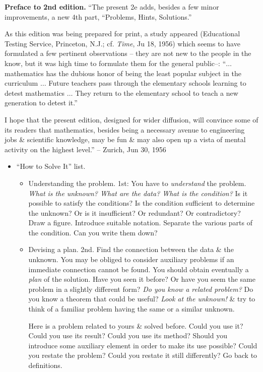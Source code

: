 \documentclass{article}
\begin{document}
\begin{enumerate}
	{\bf Preface to 2nd edition.} ``The present 2e adds, besides a few minor improvements, a new 4th part, ``Problems, Hints, Solutions.''

	As this edition was being prepared for print, a study appeared (Educational Testing Service, Princeton, N.J.; cf. {\it Time}, Ju 18, 1956) which seems to have formulated a few pertinent observations -- they are not new to the people in the know, but it was high time to formulate them for the general public--: ``$\ldots$ mathematics has the dubious honor of being the least popular subject in the curriculum $\ldots$ Future teachers pass through the elementary schools learning to detest mathematics $\ldots$ They return to the elementary school to teach a new generation to detest it.''

	I hope that the present edition, designed for wider diffusion, will convince some of its readers that mathematics, besides being a necessary avenue to engineering jobs \& scientific knowledge, may be fun \& may also open up a vista of mental activity on the highest level.'' -- Zurich, Jun 30, 1956
	\begin{itemize}
		\item {\sf ``How to Solve It'' list.}
		\begin{itemize}
			\item {\sc Understanding the problem.} 1st: You have to {\it understand} the problem. {\it What is the unknown? What are the data? What is the condition?} Is it possible to satisfy the conditions? Is the condition sufficient to determine the unknown? Or is it insufficient? Or redundant? Or contradictory? Draw a figure. Introduce suitable notation. Separate the various parts of the condition. Can you write them down?
			\item {\sc Devising a plan.} 2nd. Find the connection between the data \& the unknown. You may be obliged to consider auxiliary problems if an immediate connection cannot be found. You should obtain eventually a {\it plan} of the solution. Have you seen it before? Or have you seem the same problem in a slightly different form? {\it Do you know a related problem?} Do you know a theorem that could be useful? {\it Look at the unknown!} \& try to think of a familiar problem having the same or a similar unknown.

			{\sf Here is a problem related to yours \& solved before. Could you use it?} Could you use its result? Could you use its method? Should you introduce some auxiliary element in order to make its use possible? Could you restate the problem? Could you restate it still differently? Go back to definitions.


\end{itemize}
\end{itemize}
\end{enumerate}
\end{document}
